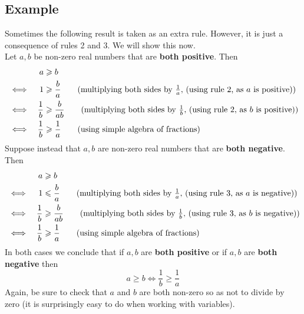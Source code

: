 \subsection{Example}
Sometimes the following result is taken as an extra rule. However, it is just a consequence of rules 2 and 3. We will show this now. \\
Let $a,b$ be non-zero real numbers that are \textbf{both positive}. Then
\begin{alignat*}{2}
&& a 
& \geq b \\
& \iff 
& 1
& \geq \frac{b}{a} \tag{multiplying both sides by $\frac{1}{a},$ (using rule 2, as $a$ is positive)} \\
& \iff
& \frac{1}{b}
& \geq \frac{b}{ab} \tag{multiplying both sides by $\frac{1}{b},$ (using rule 2, as $b$ is positive)} \\
& \iff
& \frac{1}{b}
& \geq \frac{1}{a} \tag{using simple algebra of fractions}
\end{alignat*}
Suppose instead that $a,b$ are non-zero real numbers that are \textbf{both negative}. Then
\begin{alignat*}{2}
&& a 
& \geq b \\
& \iff 
& 1
& \leq \frac{b}{a} \tag{multiplying both sides by $\frac{1}{a},$ (using rule 3, as $a$ is negative)} \\
& \iff
& \frac{1}{b}
& \geq \frac{b}{ab} \tag{multiplying both sides by $\frac{1}{b},$ (using rule 3, as $b$ is negative)} \\
& \iff
& \frac{1}{b}
& \geq \frac{1}{a} \tag{using simple algebra of fractions}
\end{alignat*}
In both cases we conclude that if $a,b$ are \textbf{both positive} or if $a,b$ are \textbf{both negative} then 
\[
a \geq b \iff \frac{1}{b} \geq \frac{1}{a}
\]
Again, be sure to check that $a$ and $b$ are both non-zero so as not to divide by zero (it is surprisingly easy to do when working with variables).

